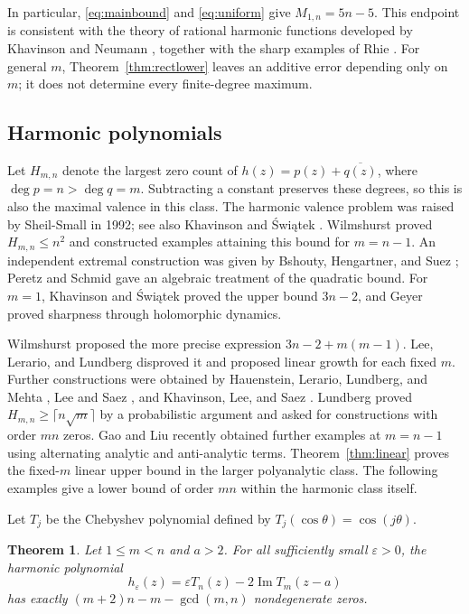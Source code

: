\documentclass[a4paper]{amsart}
\newtheorem{thm}{Theorem}
\theoremstyle{remark}
\newcommand{\eps}{\varepsilon}
\DeclareMathOperator{\Ima}{Im}
\begin{document}
In particular, \eqref{eq:mainbound} and \eqref{eq:uniform} give
\(M_{1,n}=5n-5\). This endpoint is consistent with the theory of
rational harmonic functions developed by Khavinson and Neumann
\cite{KN06}, together with the sharp examples of Rhie \cite{Rhi03}.
For general \(m\), Theorem~\ref{thm:rectlower} leaves an additive
error depending only on \(m\); it does not determine every finite-degree
maximum.

\subsection{Harmonic polynomials}
Let \(H_{m,n}\) denote the largest zero count of
\(h(z)=p(z)+\overline{q(z)}\), where \(\deg p=n>\deg q=m\).
Subtracting a constant preserves these degrees, so this is also the
maximal valence in this class. The harmonic valence problem was
raised by Sheil-Small \cite[p.~19]{SS92} in 1992; see also Khavinson and
\'{S}wi\k{a}tek \cite{KS03}. Wilmshurst \cite{WilThesis,Wil98}
proved \(H_{m,n}\le n^2\) and constructed examples attaining this
bound for \(m=n-1\). An independent extremal construction was given
by Bshouty, Hengartner, and Suez \cite{BHS95}; Peretz and Schmid
\cite{PS97} gave an algebraic treatment of the quadratic bound.
For \(m=1\), Khavinson and \'{S}wi\k{a}tek \cite{KS03} proved the
upper bound \(3n-2\), and Geyer \cite{Gey08} proved sharpness through
holomorphic dynamics.

Wilmshurst \cite[Remark 2]{Wil98} proposed the more precise expression
\(3n-2+m(m-1)\). Lee, Lerario, and Lundberg \cite{LLL15}
disproved it and proposed linear growth for each fixed \(m\).
Further constructions were obtained by Hauenstein, Lerario,
Lundberg, and Mehta \cite{HLLM15}, Lee and Saez \cite{LS17}, and
Khavinson, Lee, and Saez \cite{KLS18}. Lundberg \cite{Lun23}
proved \(H_{m,n}\ge\lceil n\sqrt m\rceil\) by a probabilistic
argument and asked for constructions with order \(mn\) zeros.
Gao and Liu \cite{GL26} recently obtained further examples at
\(m=n-1\) using alternating analytic and anti-analytic terms.
Theorem~\ref{thm:linear} proves the fixed-\(m\) linear upper bound
in the larger polyanalytic class. The following examples give a
lower bound of order \(mn\) within the harmonic class itself.

Let \(T_j\) be the Chebyshev polynomial defined by
\(T_j(\cos\theta)=\cos(j\theta)\).

\begin{thm}\label{thm:cheb}
Let \(1\le m<n\) and \(a>2\). For all sufficiently small \(\eps>0\),
the harmonic polynomial
\begin{equation}\label{eq:chebfamily}
 h_\eps(z)=\eps T_n(z)-2\Ima T_m(z-a)
\end{equation}
has exactly \((m+2)n-m-\gcd(m,n)\) nondegenerate zeros.
\end{thm}
\end{document}
